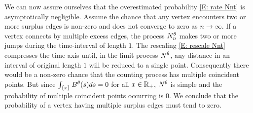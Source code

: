 We can now assure ourselves that the overestimated probability \eqref{E: rate Nnt} is asymptotically negligible.
Assume the chance that any vertex encounters two or more surplus edges is non-zero and does not converge to zero as $n \rightarrow \infty$.
If a vertex connects by multiple excess edges, the process $N_n^{\theta}$ makes two or more jumps during the time-interval of length $1$.
The rescaling \eqref{E: rescale Nnt} compresses the time axis until, in the limit process $N^{\theta}$, 
any distance in an interval of original length $1$ will be reduced to a single point.
Consequently there would be a non-zero chance that the counting process has multiple coincident points.
But since $\int_{\{x\}} B^{\theta}(s)ds = 0$ for all $x \in \mathbb{R}_+$, 
$N^{\theta}$ is simple and the probability of multiple coincident points occurring is $0$.
We conclude that the probability of a vertex having multiple surplus edges must tend to zero.


